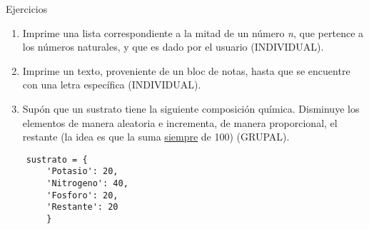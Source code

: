 \begin{frame}[fragile]{Ejercicios}\vspace{10pt}

\begin{enumerate}

	\item Imprime una lista correspondiente a la mitad de un n\'umero \textit{n}, que pertence a los n\'umeros naturales, y que es dado por el usuario (INDIVIDUAL).
	\item Imprime un texto, proveniente de un bloc de notas, hasta que se encuentre con una letra espec\'ifica (INDIVIDUAL).
	\item Sup\'on que un sustrato tiene la siguiente composici\'on qu\'imica. Disminuye los elementos de manera aleatoria e incrementa, de manera proporcional, el restante (la idea es que la suma \underline{siempre} de 100) (GRUPAL).	

\end{enumerate}
\begin{center}
\begin{lstlisting}
	sustrato = {
		'Potasio': 20,
		'Nitrogeno': 40,
		'Fosforo': 20,
		'Restante': 20					
		}
\end{lstlisting}
\end{center}
\end{frame}